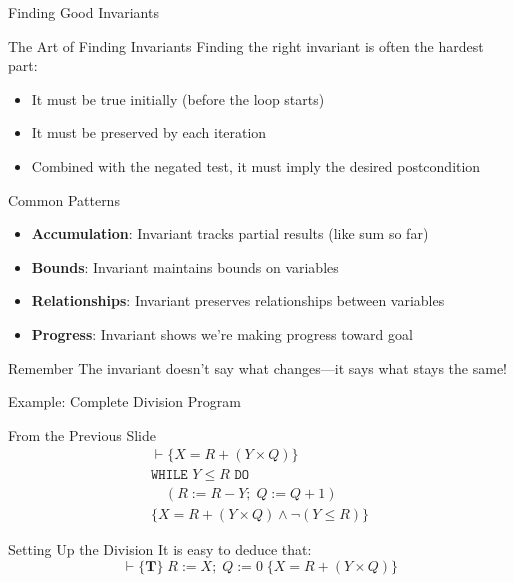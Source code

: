 \begin{frame}{Finding Good Invariants}
    \begin{block}{The Art of Finding Invariants}
        Finding the right invariant is often the hardest part:
        \begin{itemize}
            \item It must be true initially (before the loop starts)
            \item It must be preserved by each iteration
            \item Combined with the negated test, it must imply the desired postcondition
        \end{itemize}
    \end{block}
    
    \begin{block}{Common Patterns}
        \begin{itemize}
            \item \textbf{Accumulation}: Invariant tracks partial results (like sum so far)
            \item \textbf{Bounds}: Invariant maintains bounds on variables
            \item \textbf{Relationships}: Invariant preserves relationships between variables
            \item \textbf{Progress}: Invariant shows we're making progress toward goal
        \end{itemize}
    \end{block}
    
    \begin{alertblock}{Remember}
        The invariant doesn't say what changes—it says what stays the same!
    \end{alertblock}
\end{frame}

\begin{frame}{Example: Complete Division Program}
    \begin{block}{From the Previous Slide}
        \begin{align*}
        \vdash \{X=R+(Y \times Q)\} \\
        \texttt{WHILE } Y \leq R \texttt{ DO} \\
        \quad (R:=R-Y; \; Q:=Q+1) \\
        \{X=R+(Y \times Q) \wedge \neg(Y \leq R)\}
        \end{align*}
    \end{block}

    \begin{block}{Setting Up the Division}
        It is easy to deduce that:
        \[\vdash \{\mathbf{T}\} \; R:=X; \; Q:=0 \; \{X=R+(Y \times Q)\}\]
    \end{block}
\end{frame}

